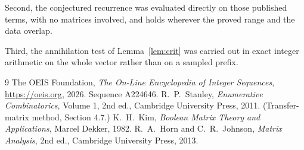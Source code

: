 \documentclass[11pt,a4paper]{article}
\theoremstyle{plain}
\theoremstyle{definition}
\begin{document}
Second, the conjectured recurrence was evaluated directly on those published terms, with no
matrices involved, and holds wherever the proved range and the data overlap.

Third, the annihilation test of Lemma~\ref{lem:crit} was carried out in exact integer
arithmetic on the whole vector rather than on a sampled prefix.

\begin{thebibliography}{9}
 The OEIS Foundation, \emph{The On-Line Encyclopedia of Integer
Sequences}, \url{https://oeis.org}, 2026. Sequence A224646.
 R.~P.~Stanley, \emph{Enumerative Combinatorics}, Volume 1, 2nd ed.,
Cambridge University Press, 2011. (Transfer-matrix method, Section 4.7.)
 K.~H.~Kim, \emph{Boolean Matrix Theory and Applications}, Marcel Dekker,
1982.
 R.~A.~Horn and C.~R.~Johnson, \emph{Matrix Analysis}, 2nd ed., Cambridge
University Press, 2013.
\end{thebibliography}
\end{document}
